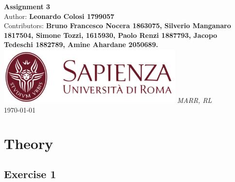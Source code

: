 \documentclass[10pt,a4paper]{article}
\begin{document}
\begin{titlepage}
    \begin{center}
        \vspace*{1cm}
        \Huge\textbf{Assignment 3}\\
        \vspace{1.5cm}
        \Large Author:
        \textbf{Leonardo Colosi 1799057}\\
        \vspace{0.5cm}
        \Large Contributors: \textbf{Bruno Francesco Nocera 1863075, Silverio Manganaro 1817504, Simone Tozzi, 1615930, Paolo Renzi 1887793, Jacopo Tedeschi 1882789, Amine Ahardane 2050689.}
        \vfill
        \includegraphics[width=0.7\textwidth]{images/sapienza_logo.png}
        \vfill
        \vspace{0.8cm}
        \Large \textit{MARR, RL}\\
        \today
    \end{center}
\end{titlepage}
\newpage

\tableofcontents
\newpage

\section{Theory}
\subsection{Exercise 1}
\end{document}
